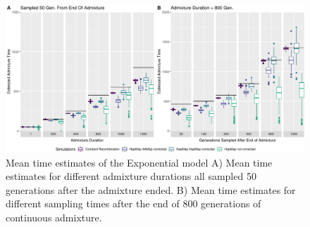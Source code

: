 \documentclass[]{article}
\begin{document}
\begin{figure}
\centering
\includegraphics{Admixture_Time_Inference_Paper_Draft_files/figure-latex/figS3-1.pdf}
\caption{\label{fig:figS3} Mean time estimates of the Exponential model A) Mean time estimates for different 
admixture durations all sampled 50 generations after the admixture ended. B) Mean time estimates for different sampling times after the end of 800
generations of continuous admixture.}
\end{figure}
\end{document}
